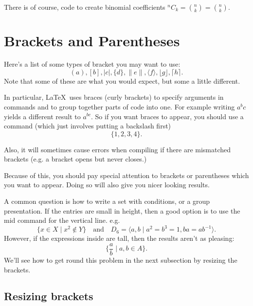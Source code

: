 \documentclass[a4paper,11pt]{article}
\begin{document}
There is of course, code to create binomial coefficients $^n C_k = \binom{n}{k}= {n \choose k} $. %


\pagebreak



\section{Brackets and Parentheses}

Here's a list of some types of bracket you may want to use:
\[ 
( a ), 				%
[ b ],  			%
| c |,   			%
\{ d \}, 			%
\| e \|, 			%
\langle f \rangle, 	%
\lfloor g \rfloor,	%
\lceil h \rceil.	%
\]
Note that some of these are what you would expect, but some a little different. 

In particular, \LaTeX \, uses braces (curly brackets) to specify arguments in commands and to group together parts of code into one. For example writing $a^bc$ yields a different result to $a^{bc}$. 
So if you want braces to appear, you should use a command (which just involves putting a backslash first)
\[ 
\{1,2,3,4\}.
\]

Also, it will sometimes cause errors when compiling if there are mismatched brackets (e.g. a bracket opens but never closes.) 

Because of this, you should pay special attention to brackets or parentheses which you want to appear. Doing so will also give you nicer looking results.

A common question is how to write a set with conditions, or a group presentation. If the entries are small in height, then a good option is to use the mid command for the vertical line. e.g.
\[ 
\{ x \in X \mid x^2 \notin Y\} 
\quad \text{and} \quad 
D_6 = \langle a, b \mid a^2=b^3=1, ba=ab^{-1} \rangle.
\]
However, if the expressions inside are tall, then the results aren't as pleasing:
\[ 
 \{\frac{a}{b} \mid  a,b \in A\}.
\]
We'll see how to get round this problem in the next subsection by resizing the brackets.






\subsection{Resizing brackets}
\end{document}
